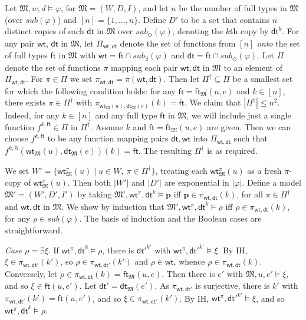 \documentclass{lmcs} %
\theoremstyle{plain}\newtheorem{satz}[thm]{Satz} %
\newcommand{\sub}{\textit{sub}}
\newcommand{\wt}{\mathsf{wt}}
\newcommand{\dt}{\mathsf{dt}}
\newcommand{\ft}{\mathsf{ft}}
\newcommand{\fform}[1]{\boldsymbol{#1}}
\newcommand{\pvar}{\fform{p}}
\begin{document}
\begin{exa}\label{s5sat}
Let $\mathfrak M, w,d \models \varphi$, for $\mathfrak M = (W,D,I)$, and let $n$ be the number of full types in $\mathfrak M$  (over $\sub(\varphi)$) and $[n] = \{1,\dots,n\}$. Define $D'$ to be a set that contains $n$ distinct copies of each $\dt$ in $\mathfrak M$ over $\sub_\Diamond(\varphi)$, denoting the $k$th copy by $\dt^k$. For any pair $\wt$, $\dt$ in $\mathfrak M$, let $\Pi_{\wt,\dt}$ denote the set of functions from $[n]$ \emph{onto} the set of full types $\ft$ in $\mathfrak{M}$ with $\wt = \ft \cap \sub_\exists(\varphi)$ and $\dt = \ft \cap \sub_\Diamond(\varphi)$. 
Let $\Pi$ denote the set of functions $\pi$ mapping each pair $\wt,\dt$ in $\mathfrak{M}$ to an element of $\Pi_{\wt,\dt}$. For $\pi\in \Pi$ we set 
$\pi_{\wt,\dt}=\pi(\wt,\dt)$. Then let $\Pi^{\dag}\subseteq \Pi$
be a smallest set for which the following condition holds: 
for any $\ft=\ft_{\mathfrak M}(u,e)$ and $k\in [n]$, there exists $\pi\in \Pi^{\dag}$ with $\pi_{\wt_{\mathfrak M}(u),\dt_{\mathfrak M}(e)}(k) = \ft$. 
%
We claim that $|\Pi^{\dag}|\leq n^{2}$. Indeed, for any $k\in [n]$ and any full type $\ft$ in $\mathfrak{M}$,
we will include just a single function $f^{k,\ft}\in \Pi$ in $\Pi^\dag$.
Assume $k$ and $\ft=\ft_{\mathfrak{M}}(u,e)$ are given. Then we can choose $f^{k,\ft}$ to be any function mapping pairs $\dt,\wt$ into $\Pi_{\wt,\dt}$ such that $f^{k,\ft}(\wt_{\mathfrak{M}}(u),\dt_{\mathfrak{M}}(e))(k)=\ft$. The resulting $\Pi^{\dag}$ is as required.

We set $W' = \{\wt^\pi_{\mathfrak M}(u) \mid u \in W,\ \pi \in \Pi^{\dag}\}$, treating each $\wt^\pi_{\mathfrak M}(u)$ as
a fresh $\pi$-copy of $\wt^\pi_{\mathfrak M}(u)$. Then both $|W'|$ and $|D'|$ are exponential in $|\varphi|$. Define a model $\mathfrak M' = (W',D',I')$ by taking $\mathfrak M', \wt^\pi, \dt^k \models \pvar$ iff $\pvar \in \pi_{\wt,\dt}(k)$, for all $\pi\in \Pi^{\dag}$ and $\wt,\dt$ in $\mathfrak{M}$. We show by induction that $\mathfrak M', \wt^\pi, \dt^k \models \rho$ iff $\rho \in \pi_{\wt,\dt}(k)$, for any $\rho \in \sub(\varphi)$. The basis of induction and the Boolean cases are straightforward.

\emph{Case} $\rho = \exists \xi$. If $\wt^\pi,\dt^k \models \rho$, there is $\dt'^{k'}$ with $\wt^\pi,\dt'^{k'} \models \xi$. By IH, $\xi \in \pi_{\wt,\dt'}(k')$, so $\rho \in \pi_{\wt,\dt'}(k')$ and $\rho \in \wt$, whence  $\rho \in \pi_{\wt,\dt}(k)$. Conversely, let $\rho \in \pi_{\wt,\dt}(k) = \ft_{\mathfrak{M}}(u,e)$. Then there is $e'$ with $\mathfrak{M}, u, e' \models \xi$, and so $\xi\in\ft(u,e')$. Let $\dt'=\dt_{\mathfrak M}(e')$. 
As $\pi_{\wt,\dt'}$ is surjective, there is $k'$ with $\pi_{\wt,\dt'}(k')=\ft(u,e')$, and so  $\xi\in \pi_{\wt,\dt'}(k')$. By IH, $\wt^\pi, \dt'^{k'} \models \xi$, and so $\wt^\pi, \dt^k \models \rho$. 


\end{exa}
\end{document}
